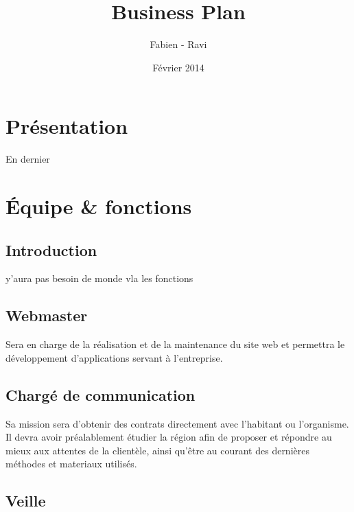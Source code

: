 \documentclass[10pt]{article}
\title{\textbf{Business Plan}\\{ {\small {\bsc {- Res Publica -}}}}}
\author{Fabien \bsc{Buisson} - Ravi \bsc{Pachy}}
\date{Février 2014}
\begin{document}
\renewcommand{\contentsname}{Sommaire}
\maketitle
\thispagestyle{empty}

\newpage

\tableofcontents

\newpage
\pagestyle{headings}

\section{Présentation}
\label{sec:presentation}
En dernier



\section{Équipe \& fonctions}
\label{sec:equipe_fonctions}

\subsection{Introduction}
\label{sub:equipe_intro}
y'aura pas besoin de monde
vla les fonctions

\subsection{Webmaster}
\label{sec:webmaster}
Sera en charge de la réalisation et de la maintenance du site web et permettra le développement d'applications servant à l'entreprise.


\subsection{Chargé de communication}
\label{sec:communication}
Sa mission sera d'obtenir des contrats directement avec l'habitant ou l'organisme. Il devra avoir préalablement étudier la région afin de proposer et répondre au mieux aux attentes de la clientèle, ainsi qu'être au courant des dernières méthodes et materiaux utilisés.


\subsection{Veille}
\label{sec:}
\end{document}
